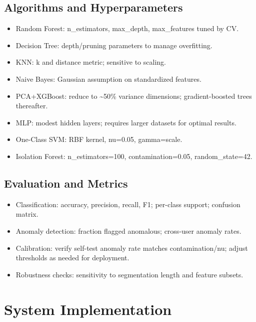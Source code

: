 \documentclass[
  12pt,
]{article}
\providecommand{\tightlist}{%
  \setlength{\itemsep}{0pt}\setlength{\parskip}{0pt}}
\begin{document}
\subsection{Algorithms and
Hyperparameters}\label{algorithms-and-hyperparameters}

\begin{itemize}
\tightlist
\item
  Random Forest: n\_estimators, max\_depth, max\_features tuned by CV.
\item
  Decision Tree: depth/pruning parameters to manage overfitting.
\item
  KNN: k and distance metric; sensitive to scaling.
\item
  Naive Bayes: Gaussian assumption on standardized features.
\item
  PCA+XGBoost: reduce to \textasciitilde50\% variance dimensions;
  gradient-boosted trees thereafter.
\item
  MLP: modest hidden layers; requires larger datasets for optimal
  results.
\item
  One-Class SVM: RBF kernel, nu=0.05, gamma=scale.
\item
  Isolation Forest: n\_estimators=100, contamination=0.05,
  random\_state=42.
\end{itemize}

\subsection{Evaluation and Metrics}\label{evaluation-and-metrics}

\begin{itemize}
\tightlist
\item
  Classification: accuracy, precision, recall, F1; per-class support;
  confusion matrix.
\item
  Anomaly detection: fraction flagged anomalous; cross-user anomaly
  rates.
\item
  Calibration: verify self-test anomaly rate matches contamination/nu;
  adjust thresholds as needed for deployment.
\item
  Robustness checks: sensitivity to segmentation length and feature
  subsets.
\end{itemize}

\section{System Implementation}\label{system-implementation}
\end{document}
